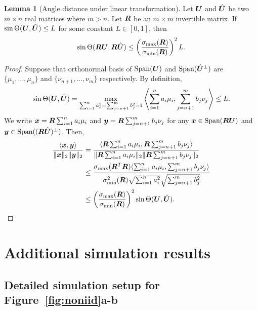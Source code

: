 \documentclass[12pt]{article}
\theoremstyle{definition}
\newtheorem{lem}{Lemma}[section]
\begin{document}
\begin{lem}[Angle distance under linear transformation]\label{lem:sint}
Let $\bm{U}$ and $\hat{\bm{U}}$ be two $m\times n$ real matrices where $m>n$.  Let $\bm{R}$ be an $m\times m$ invertible matrix. If $\sin\Theta(\bm{U},\hat{\bm{U}})\leq L$ for some constant $L\in[0,1]$, then
\begin{align}
    \sin \Theta(\bm{R}\bm{U},\bm{R}\hat{\bm{U}})\leq\left(\sigma_{\max}(\bm{R})\over \sigma_{\min}(\bm{R})\right)^2 L.
\end{align}
\end{lem}
\begin{proof}
Suppose that orthonormal basis of $\text{Span}(\bm{U})$  and $\text{Span}(\hat{\bm{U}}^{\perp})$ are $\{\mu_1,\ldots,\mu_n\}$ and $\{\nu_{n+1},\ldots,\nu_{m}\}$ respectively. By definition, 
\begin{align}
    \sin \Theta(\bm{U},\hat{\bm{U}}) = \max_{\sum_{i=1}^n a_i^2 = \sum_{j=n+1}^m b_j^2 = 1} \left\langle \sum_{i=1}^n a_i\mu_i,\sum_{j=n+1}^m b_j\nu_j\right\rangle \leq L.
\end{align}
We write $\bm x = \bm{R}\sum_{i=1}^n a_i\mu_i$ and $\bm{y} = \bm{R}\sum_{j=n+1}^m b_j\nu_j$ for any $\bm x\in \text{Span}(\bm{R}\bm{U})$ and $\bm{y}\in\text{Span}((\bm{R}\hat{\bm{U}})^{\perp})$.
Then,
\begin{align}
    {\langle \bm x,\bm{y}\rangle\over \|\bm x\|_2\|\bm{y}\|_2} &= {\langle  \bm{R}\sum_{i=1}^n a_i\mu_i, \bm{R}\sum_{j=n+1}^m b_j\nu_j\rangle\over \|\bm{R}\sum_{i=1}^n a_i\mu_i\|_2\|\bm{R}\sum_{j=n+1}^m b_j\nu_j\|_2 }\\&\leq {\sigma_{\max}(\bm{R}^T\bm{R})\langle \sum_{i=1}^n a_i\mu_i,\sum_{j=n+1}^m b_j\nu_j\rangle\over \sigma_{\min}^2(\bm{R})\sqrt{ \sum_{i=1}^n a_i^2}\sqrt{\sum_{j=n+1}^m b_j^2} }\\&\leq \left(\sigma_{\max}(\bm{R})\over \sigma_{\min}(\bm{R})\right)^2 \sin\Theta(\bm{U},\hat{\bm{U}}).
\end{align}


\end{proof}




\section{Additional simulation results}\label{sec:asimulation}  

\subsection{Detailed simulation setup for Figure~\ref{fig:noniid}a-b}
\end{document}
